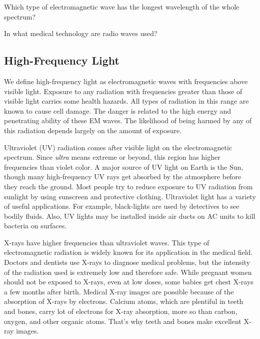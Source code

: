 \documentclass{article}
\numberwithin{equation}{section}
\numberwithin{figure}{section}
\begin{document}
\begin{exercise}
    Which type of electromagnetic wave has the longest wavelength of the whole spectrum?
\end{exercise}

\begin{exercise}
    In what medical technology are radio waves used?
\end{exercise}

\clearpage
\subsection{High-Frequency Light} \label{QoTj3l}

We define high-frequency light as electromagnetic waves with frequencies above visible light. Exposure to any radiation with frequencies greater than those of visible light carries some health hazards. All types of radiation in this range are known to cause cell damage. The danger is related to the high energy and penetrating ability of these EM waves. The likelihood of being harmed by any of this radiation depends largely on the amount of exposure. 



\vspace{1em}

Ultraviolet (UV) radiation comes after visible light on the electromagnetic spectrum.  Since \textit{ultra} means extreme or beyond, this region has higher frequencies than violet color. A major source of UV light on Earth is the Sun, though many high-frequency UV rays get absorbed by the atmosphere before they reach the ground. Most people try to reduce exposure to UV radiation from sunlight by using sunscreen and protective clothing. Ultraviolet light has a variety of useful applications. For example, black-lights are used by detectives to see bodily fluids. Also, UV lights may be installed inside air ducts on AC units to kill bacteria on surfaces.  

\vspace{1em}

X-rays have higher frequencies than ultraviolet waves. This type of electromagnetic radiation is widely known for its application in the medical field. Doctors and dentists use X-rays to diagnose medical problems, but the intensity of the radiation used is extremely low and therefore safe. While pregnant women should not be exposed to X-rays, even at low doses, some babies get chest X-rays a few months after birth. Medical X-ray images are possible because of the absorption of X-rays by electrons. Calcium atoms, which are plentiful in teeth and bones, carry lot of electrons for X-ray absorption, more so than carbon, oxygen, and other organic atoms. That's why teeth and bones make excellent X-ray images.
\end{document}
